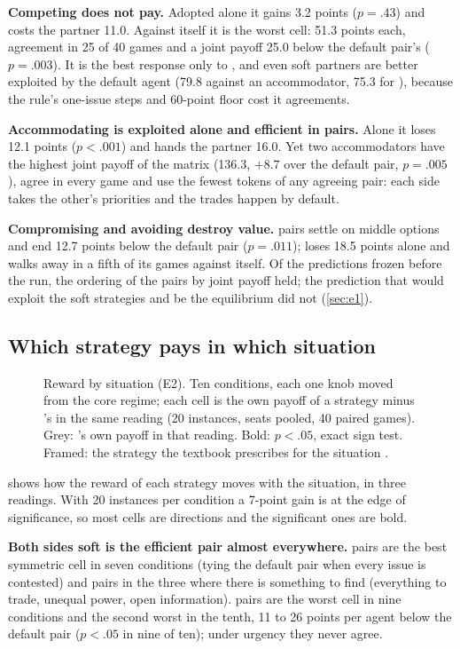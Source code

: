 \textbf{Competing does not pay.} Adopted alone it gains 3.2 points ($p = .43$) and costs the partner 11.0. Against itself it is the worst cell: 51.3 points each, agreement in 25 of 40 games and a joint payoff 25.0 below the default pair's ($p = .003$). It is the best response only to \compromising, and even soft partners are better exploited by the default agent (79.8 against an accommodator, 75.3 for \competing), because the rule's one-issue steps and 60-point floor cost it agreements.

\textbf{Accommodating is exploited alone and efficient in pairs.} Alone it loses 12.1 points ($p < .001$) and hands the partner 16.0. Yet two accommodators have the highest joint payoff of the matrix (136.3, $+8.7$ over the default pair, $p = .005$), agree in every game and use the fewest tokens of any agreeing pair: each side takes the other's priorities and the trades happen by default.

\textbf{Compromising and avoiding destroy value.} \compromising{} pairs settle on middle options and end 12.7 points below the default pair ($p = .011$); \avoiding{} loses 18.5 points alone and walks away in a fifth of its games against itself. Of the predictions frozen before the run, the ordering of the pairs by joint payoff held; the prediction that \competing{} would exploit the soft strategies and be the equilibrium did not (\cref{sec:e1}).

\subsection{Which strategy pays in which situation}
\label{sec:r-map}

\begin{figure}[t]
\centering
\FigReward
\caption{Reward by situation (E2). Ten conditions, each one knob moved from the core regime; each cell is the own payoff of a strategy minus \neutral's in the same reading (20 instances, seats pooled, 40 paired games). Grey: \neutral's own payoff in that reading. Bold: $p < .05$, exact sign test. Framed: the strategy the textbook prescribes for the situation \citep{thomas1977toward}.}
\label{fig:reward}
\end{figure}

 shows how the reward of each strategy moves with the situation, in three readings. With 20 instances per condition a 7-point gain is at the edge of significance, so most cells are directions and the significant ones are bold.

\textbf{Both sides soft is the efficient pair almost everywhere.} \accommodating{} pairs are the best symmetric cell in seven conditions (tying the default pair when every issue is contested) and \collaborating{} pairs in the three where there is something to find (everything to trade, unequal power, open information). \competing{} pairs are the worst cell in nine conditions and the second worst in the tenth, 11 to 26 points per agent below the default pair ($p < .05$ in nine of ten); under urgency they never agree.


